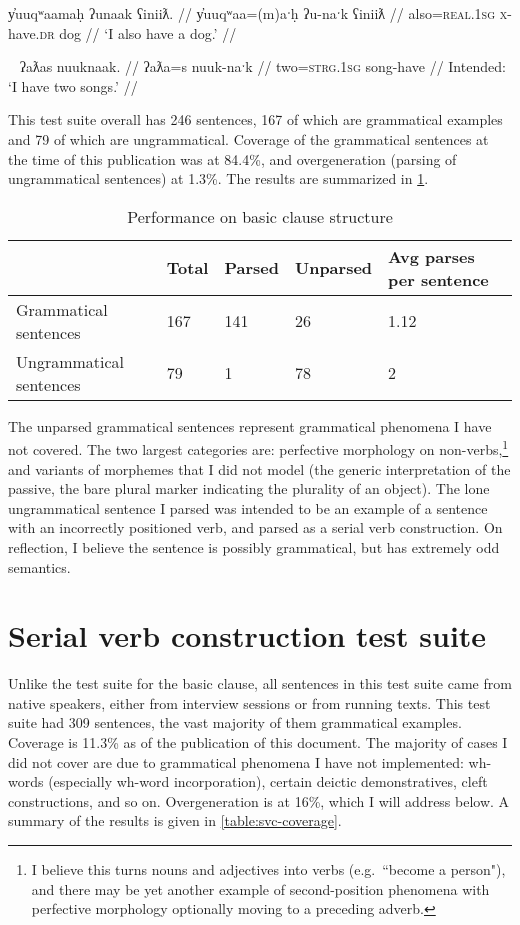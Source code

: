 \ex \label{ex:alsohavedog}
\begingl
\glpreamble y̓uuqʷaamaḥ ʔunaak ʕiniiƛ. //
\gla y̓uuqʷaa=(m)aˑḥ ʔu-naˑk ʕiniiƛ //
\glb also=\textsc{real.1sg} \textsc{x}-have.\textsc{dr} dog //
\glft `I also have a dog.' //
\endgl
\xe

\ex~ \label{ex:*twohavesong}
\begingl
\glpreamble *ʔaƛas nuuknaak. //
\gla ʔaƛa=s nuuk-naˑk //
\glb two=\textsc{strg.1sg} song-have //
\glft Intended: `I have two songs.' //
\endgl
\xe

This test suite overall has 246 sentences, 167 of which are grammatical examples and 79 of which are ungrammatical. Coverage of the grammatical sentences at the time of this publication was at 84.4\%, and overgeneration (parsing of ungrammatical sentences) at 1.3\%. The results are summarized in \cref{table:clause-coverage}.

\begin{table}[H]
\centering
\label{table:clause-coverage}
\caption{Performance on basic clause structure}
\begin{tabular}{l|llll}
 & Total & Parsed & Unparsed & Avg parses per sentence\\ \hline
Grammatical sentences & 167 & 141 & 26 & 1.12 \\ \hline
Ungrammatical sentences & 79 & 1 & 78 & 2
\end{tabular}
\end{table}

The unparsed grammatical sentences represent grammatical phenomena I have not covered. The two largest categories are: perfective morphology on non-verbs,\footnote{I believe this turns nouns and adjectives into verbs (e.g.\ ``become a person"), and there may be yet another example of second-position phenomena with perfective morphology optionally moving to a preceding adverb.} and variants of morphemes that I did not model (the generic interpretation of the passive, the bare plural marker indicating the plurality of an object). The lone ungrammatical sentence I parsed was intended to be an example of a sentence with an incorrectly positioned verb, and parsed as a serial verb construction. On reflection, I believe the sentence is possibly grammatical, but has extremely odd semantics.

\section{Serial verb construction test suite} \label{ch:results:sv}

Unlike the test suite for the basic clause, all sentences in this test suite came from native speakers, either from interview sessions or from running texts. This test suite had 309 sentences, the vast majority of them grammatical examples. Coverage is 11.3\% as of the publication of this document. The majority of cases I did not cover are due to grammatical phenomena I have not implemented: wh-words (especially wh-word incorporation), certain deictic demonstratives, cleft constructions, and so on. Overgeneration is at 16\%, which I will address below. A summary of the results is given in \cref{table:svc-coverage}.

